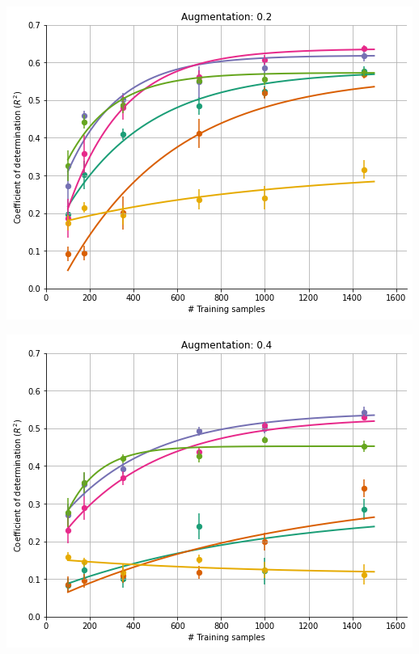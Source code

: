 \documentclass[a0paper,landscape,fontscale=0.365]{baposter}
\newenvironment{Figure}
  {\par\medskip\noindent\minipage{\linewidth}}
  {\endminipage\par\medskip}
\begin{document}
\begin{poster}
{\begin{multicols}{4}
    \columnbreak
    \begin{Figure}
        \centering
        \includegraphics[width=1.0\linewidth]{figures/curves_aug_5}
    \end{Figure}

    \columnbreak
    \begin{Figure}
        \centering
        \includegraphics[width=1.0\linewidth]{figures/curves_aug_2.5}
    \end{Figure}


\end{multicols}}
\end{poster}
\end{document}
